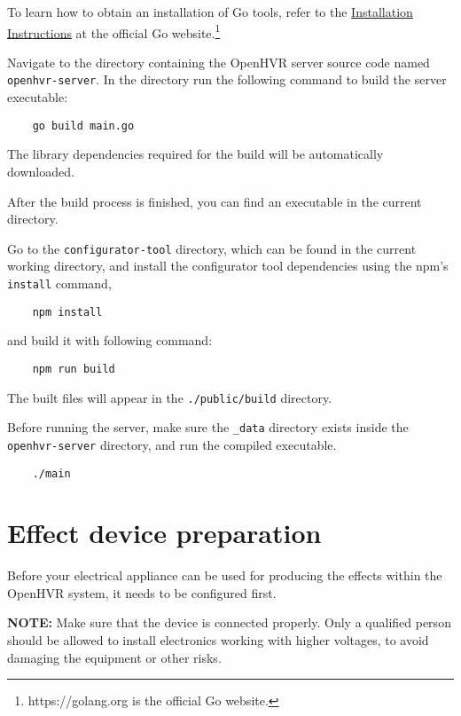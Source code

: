 To learn how to obtain an installation of Go tools, refer to the
\hyperlink{https://golang.org/doc/install}{Installation Instructions} at the
official Go website.\footnote{https://golang.org is the official Go website.}

Navigate to the directory containing the OpenHVR server source code named
\verb|openhvr-server|. In the directory run the following command to build the
server executable:

\begin{verbatim}
    go build main.go
\end{verbatim}

The library dependencies required for the build will be automatically downloaded.

After the build process is finished, you can find an executable in the current
directory.

Go to the \verb|configurator-tool| directory, which can be found in the current
working directory, and install the configurator tool dependencies using the npm's
\verb|install| command,

\begin{verbatim}
    npm install
\end{verbatim}

and build it with following command:

\begin{verbatim}
    npm run build
\end{verbatim}

The built files will appear in the \verb|./public/build| directory.

Before running the server, make sure the \verb|_data| directory exists inside
the \verb|openhvr-server| directory, and run the compiled executable.

\begin{verbatim}
    ./main
\end{verbatim}

\section{Effect device preparation}

Before your electrical appliance can be used for producing the effects
within the OpenHVR system, it needs to be configured first.

\textbf{NOTE:} Make sure that the device is connected properly. Only a qualified
person should be allowed to install electronics working with higher voltages, to avoid
damaging the equipment or other risks.

